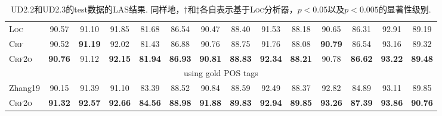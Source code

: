 \begin{table*}[tb]
\begin{tabularx}{\textwidth}{lccccccccccccc}
        \textsc{Loc}                  & 90.57          & 91.10          & 91.85                            & 81.68                           & 86.54                           & 90.47                            & 88.40                           & 91.53                            & 88.18                            & 90.65                           & 86.31                            & 92.91                            & 89.19                            \\
        \textsc{Crf}                  & 90.52          & \textbf{91.19} & 92.02                            & 81.43                           & 86.88\rlap{$^\dagger$}          & 90.76\rlap{$^\dagger$}           & 88.75                           & 91.76                            & 88.08                            & \textbf{90.79}                  & 86.54                            & 93.16\rlap{$^\ddagger$}          & 89.32\rlap{$^\ddagger$}          \\
        \textsc{Crf2o}                & \textbf{90.76} & 91.12          & \textbf{92.15}\rlap{$^\ddagger$} & \textbf{81.94}                  & \textbf{86.93}\rlap{$^\dagger$} & \textbf{90.81}\rlap{$^\ddagger$} & \textbf{88.83}\rlap{$^\dagger$} & \textbf{92.34}\rlap{$^\ddagger$} & \textbf{88.21}\rlap{$^\dagger$}  & 90.78                           & \textbf{86.62}                   & \textbf{93.22}\rlap{$^\ddagger$} & \textbf{89.48}\rlap{$^\ddagger$} \\
        \multicolumn{14}{c}{using gold POS tags}                                                                                                                                                                                                                                                                                                                                                                                                                     \\[1pt]
        Zhang19                       & 90.15          & 91.39          & 91.10                            & 83.39                           & 88.52                           & 90.84                            & 88.59                           & 92.49                            & 88.37                            & 92.82                           & 84.89                            & 93.11                            & 89.85                            \\
        \textsc{Crf2o}                & \textbf{91.32} & \textbf{92.57} & \textbf{92.66}                   & \textbf{84.56}                  & \textbf{88.98}                  & \textbf{91.88}                   & \textbf{89.83}                  & \textbf{92.94}                   & \textbf{89.85}                   & \textbf{93.26}                  & \textbf{87.39}                   & \textbf{93.86}                   & \textbf{90.76}                   \\
        \bottomrule
    \end{tabularx}
    \caption{UD2.2和UD2.3的test数据的LAS结果.
        同样地，$\dagger$和$\ddagger$各自表示基于\textsc{Loc}分析器，$p<0.05$以及$p<0.005$的显著性级别. }
    \label{table:ud-test}
\end{table*}

